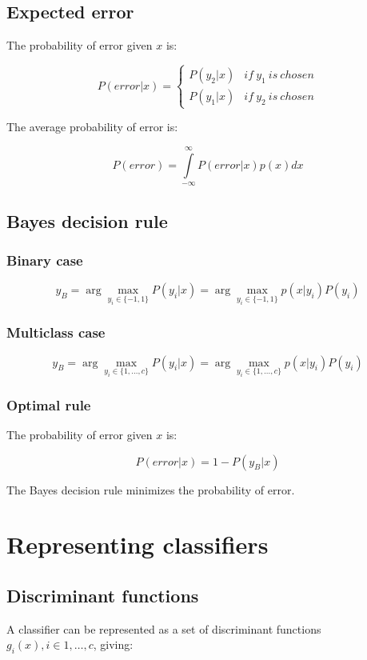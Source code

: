 	\subsection{Expected error}
	The probability of error given $x$ is:

	$$P(error|x) = \begin{cases} P(y_2|x) &if\ y_1\ is\ chosen \\ P(y_1|x) &if\ y_2\ is\ chosen\end{cases}$$

	The average probability of error is:

	$$P(error) = \int\limits_{-\infty}^\infty P(error|x)p(x)dx$$

	\subsection{Bayes decision rule}

		\subsubsection{Binary case}

		$$y_B = \arg\max\limits_{y_i\in\{-1,1\}} P(y_i|x) = \arg\max\limits_{y_i\in\{-1,1\}}p(x|y_i)P(y_i)$$

		\subsubsection{Multiclass case}

		$$y_B = \arg\max\limits_{y_i\in\{1, \dots, c\}} P(y_i|x) = \arg\max\limits_{y_i\in\{1, \dots, c\}}p(x|y_i)P(y_i)$$

		\subsubsection{Optimal rule}
		The probability of error given $x$ is:

		$$P(error|x) = 1 - P(y_B|x)$$

		The Bayes decision rule minimizes the probability of error.

\section{Representing classifiers}

	\subsection{Discriminant functions}
	A classifier can be represented as a set of discriminant functions $g_i(x), i\in 1, \dots, c$, giving:


